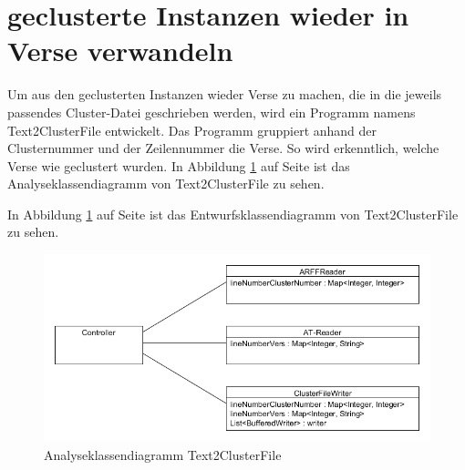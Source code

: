 \section{geclusterte Instanzen wieder in Verse verwandeln} \label{Text2ClusterFile}
Um aus den geclusterten Instanzen wieder Verse zu machen, die in die jeweils passendes Cluster-Datei geschrieben werden, wird ein Programm namens Text2\-Cluster\-File entwickelt. Das Programm gruppiert anhand der Clusternummer und der Zeilennummer die Verse. So wird erkenntlich, welche Verse wie geclustert wurden. In Abbildung \ref{fig:AnalyseklassendiagrammText2ClusterFile} auf Seite \pageref{fig:AnalyseklassendiagrammText2ClusterFile} ist das Analyseklassendiagramm von Text2\-Cluster\-File zu sehen.

In Abbildung \ref{fig:AnalyseklassendiagrammText2ClusterFile} auf Seite \pageref{fig:AnalyseklassendiagrammText2ClusterFile} ist das Entwurfsklassendiagramm von Text2ClusterFile zu sehen.

\begin{figure}[htp]
\centering
\includegraphics[width=1\textwidth]{Ingo/Bilder/AnalyseklassendiagrammText2ClusterFile.png}
\caption{Analyseklassendiagramm Text2ClusterFile}
\label{fig:AnalyseklassendiagrammText2ClusterFile}
\end{figure}

